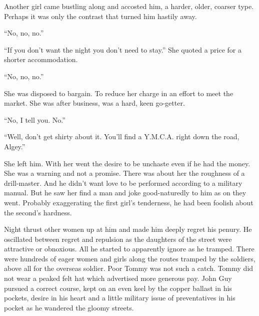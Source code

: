 Another girl came bustling along and accosted him, a harder, older, coarser type. Perhaps it was only the contrast that turned him hastily away.

``No, no, no.''

``If you don't want the night you don't need to stay.'' She quoted a price for a shorter accommodation.

``No, no, no.''

She was disposed to bargain. To reduce her charge in an effort to meet the market. She was after business, was a hard, keen go-getter.

``No, I tell you. No.''

``Well, don't get shirty about it. You'll find a Y.M.C.A. right down the road, Algey.''

She left him. With her went the desire to be unchaste even if he had the money. She was a warning and not a promise. There was about her the roughness of a drill-master. And he didn't want love to be performed according to a military manual. But he saw her find a man and joke good-naturedly to him as on they went. Probably exaggerating the first girl's tenderness, he had been foolish about the second's hardness.

Night thrust other women up at him and made him deeply regret his penury. He oscillated between regret and repulsion as the daughters of the street were attractive or obnoxious. All he started to apparently ignore as he tramped. There were hundreds of eager women and girls along the routes tramped by the soldiers, above all for the overseas soldier. Poor Tommy was not such a catch. Tommy did not wear a peaked felt hat which advertised more generous pay. John Guy pursued a correct course, kept on an even keel by the copper ballast in his pockets, desire in his heart and a little military issue of preventatives in his pocket as he wandered the gloomy streets.

